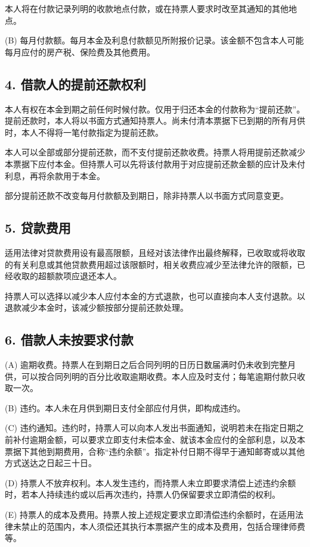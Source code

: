 \documentclass[UTF8,fontset=none,11pt,a4paper]{ctexart}
\begin{document}
本人将在付款记录列明的收款地点付款，或在持票人要求时改至其通知的其他地点。


(B) 每月付款额。每月本金及利息付款额见所附报价记录。该金额不包含本人可能每月应付的房产税、保险费及其他费用。


\subsection*{4. 借款人的提前还款权利}
本人有权在本金到期之前任何时候付款。仅用于归还本金的付款称为“提前还款”。提前还款时，本人将以书面方式通知持票人。尚未付清本票据下已到期的所有月供时，本人不得将一笔付款指定为提前还款。


本人可以全部或部分提前还款，而不支付提前还款收费。持票人将用提前还款减少本票据下应付本金。但持票人可以先将该付款用于对应提前还款金额的应计及未付利息，再将余款用于本金。


部分提前还款不改变每月付款额及到期日，除非持票人以书面方式同意变更。


\subsection*{5. 贷款费用}
适用法律对贷款费用设有最高限额，且经对该法律作出最终解释，已收取或将收取的有关利息或其他贷款费用超过该限额时，相关收费应减少至法律允许的限额，已经收取的超额款项应退还本人。


持票人可以选择以减少本人应付本金的方式退款，也可以直接向本人支付退款。以退款减少本金时，该减少额按部分提前还款处理。


\subsection*{6. 借款人未按要求付款}
(A) 逾期收费。持票人在到期日之后合同列明的日历日数届满时仍未收到完整月供，可以按合同列明的百分比收取逾期收费。本人应及时支付；每笔逾期付款只收取一次。


(B) 违约。本人未在月供到期日支付全部应付月供，即构成违约。


(C) 违约通知。违约时，持票人可以向本人发出书面通知，说明若未在指定日期之前补付逾期金额，可以要求立即支付未偿本金、就该本金应付的全部利息，以及本票据下其他到期费用，合称“违约余额”。指定补付日期不得早于通知邮寄或以其他方式送达之日起三十日。


(D) 持票人不放弃权利。本人发生违约，而持票人未立即要求清偿上述违约余额时，若本人持续违约或以后再次违约，持票人仍保留要求立即清偿的权利。


(E) 持票人的成本及费用。持票人按上述规定要求立即清偿违约余额时，在适用法律未禁止的范围内，本人须偿还其执行本票据产生的成本及费用，包括合理律师费等。
\end{document}
